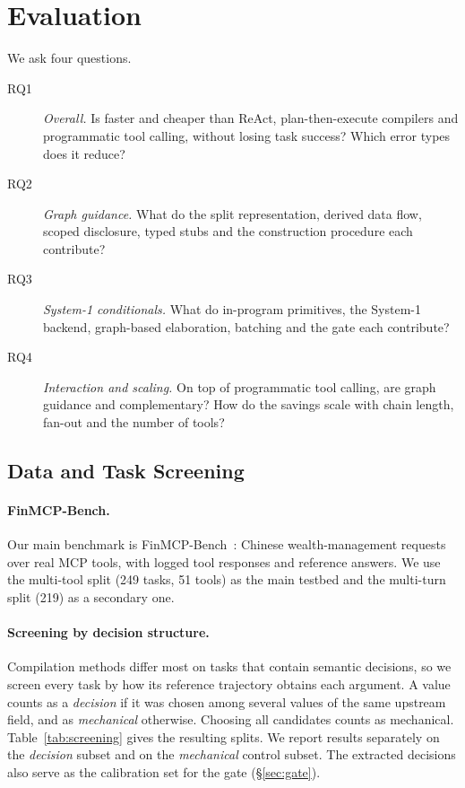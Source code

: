 \section{Evaluation}
\label{sec:experiments}

We ask four questions.
\begin{description}
  \item[RQ1] \emph{Overall.} Is \jif faster and cheaper than ReAct, plan-then-execute compilers and programmatic tool calling, without losing task success? Which error types does it reduce?
  \item[RQ2] \emph{Graph guidance.} What do the split representation, derived data flow, scoped disclosure, typed stubs and the construction procedure each contribute?
  \item[RQ3] \emph{System-1 conditionals.} What do in-program primitives, the System-1 backend, graph-based elaboration, batching and the gate each contribute?
  \item[RQ4] \emph{Interaction and scaling.} On top of programmatic tool calling, are graph guidance and \jif complementary? How do the savings scale with chain length, fan-out and the number of tools?
\end{description}

\subsection{Data and Task Screening}
\label{sec:screening}
\paragraph{FinMCP-Bench.} Our main benchmark is FinMCP-Bench~\cite{zhu2026finmcp}: Chinese wealth-management requests over real MCP tools, with logged tool responses and reference answers. We use the multi-tool split (249 tasks, 51 tools) as the main testbed and the multi-turn split (219) as a secondary one. 

\paragraph{Screening by decision structure.} Compilation methods differ most on tasks that contain semantic decisions, so we screen every task by how its reference trajectory obtains each argument. A value counts as a \emph{decision} if it was chosen among several values of the same upstream field, and as \emph{mechanical} otherwise. Choosing all candidates counts as mechanical. Table~\ref{tab:screening} gives the resulting splits. We report results separately on the \emph{decision} subset and on the \emph{mechanical} control subset. The extracted decisions also serve as the calibration set for the gate (\S\ref{sec:gate}). 

